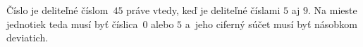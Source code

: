 {%
\def\tablica#1{\vbox{\bgroup\offinterlineskip
  \def \vvrule{\vrule \kern 1.4pt \vrule}
  \def \\{\crcr\omit\vvrule\hrulefill\vvrule&\multispan 4\hrulefill\vvrule\cr}
  \def \vkern{\multispan 5\vrule  height 1.2pt \hfil \vrule }
  \def\strut {\vrule  height 13pt depth 7pt width 0pt }
  \halign  {\vvrule\quad\hfil$##$\hfil\quad\vvrule &\quad\hfil##\hfil\quad\vrule &\quad\hfil##\hfil\quad\vrule &\quad\hfil##\hfil\quad\vrule &\quad\hfil##\hfil\quad \vvrule\strut \cr
  \noalign{\hrule} \vkern\\ #1 \vkern\cr\noalign{\hrule}}
  \egroup}}

\def\tablicb#1{\vbox{\bgroup\offinterlineskip
  \def \vvrule{\vrule \kern 1.4pt \vrule}
  \def \\{\crcr\omit\vvrule\hrulefill\vvrule&\multispan 7\hrulefill\vvrule\cr}
  \def \vkern{\multispan 8\vrule  height 1.2pt \hfil \vrule }
  \def\strut {\vrule  height 13pt depth 7pt width 0pt }
  \halign  {\vvrule\quad\hfil$##$\hfil\quad\vvrule &\quad\hfil##\hfil\quad\vrule &\quad\hfil##\hfil\quad\vrule &\quad\hfil##\hfil\quad\vrule &\quad\hfil##\hfil\quad\vrule &\quad\hfil##\hfil\quad\vrule &\quad\hfil##\hfil\quad\vrule &\quad\hfil##\hfil\quad \vvrule\strut \cr
  \noalign{\hrule} \vkern\\ #1 \vkern\cr\noalign{\hrule}}
  \egroup}}

\def\tablicc#1{\vbox{\bgroup\offinterlineskip
  \def \vvrule{\vrule \kern 1.4pt \vrule}
  \def \\{\crcr\omit\vvrule\hrulefill\vvrule&\multispan 8\hrulefill\vvrule\cr}
  \def \vkern{\multispan 9\vrule  height 1.2pt \hfil \vrule }
  \def\strut {\vrule  height 13pt depth 7pt width 0pt }
  \halign  {\vvrule\quad\hfil$##$\hfil\quad\vvrule &\quad\hfil##\hfil\quad\vrule &\quad\hfil##\hfil\quad\vrule &\quad\hfil##\hfil\quad\vrule &\quad\hfil##\hfil\quad\vrule &\quad\hfil##\hfil\quad\vrule &\quad\hfil##\hfil\quad\vrule &\quad\hfil##\hfil\quad\vrule &\quad\hfil##\hfil\quad \vvrule\strut \cr
  \noalign{\hrule} \vkern\\ #1 \vkern\cr\noalign{\hrule}}
  \egroup}}

\def\tablicd#1{\vbox{\bgroup\offinterlineskip
  \def \vvrule{\vrule \kern 1.4pt \vrule}
  \def \\{\crcr\omit\vvrule\hrulefill\vvrule&\multispan 3\hrulefill\vvrule\cr}
  \def \vkern{\multispan 4\vrule  height 1.2pt \hfil \vrule }
  \def\strut {\vrule  height 13pt depth 7pt width 0pt }
  \halign  {\vvrule\quad\hfil$##$\hfil\quad\vvrule &\quad\hfil##\hfil\quad\vrule &\quad\hfil##\hfil\quad\vrule &\quad\hfil##\hfil\quad \vvrule\strut \cr
  \noalign{\hrule} \vkern\\ #1 \vkern\cr\noalign{\hrule}}
  \egroup}}
Číslo je deliteľné číslom~$45$ práve vtedy, keď je deliteľné číslami $5$ aj $9$.
Na mieste jednotiek teda musí byť číslica~$0$ alebo $5$ a~jeho ciferný súčet musí
byť násobkom deviatich.

}
